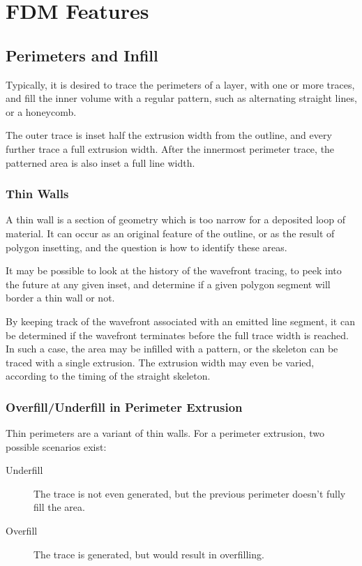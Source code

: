 \documentclass[12pt,a4paper,oneside,openany]{article}
\begin{document}
\section{FDM Features}

\subsection {Perimeters and Infill}

Typically, it is desired to trace the perimeters of a layer, with one or more traces, and fill the inner volume with a regular pattern, such as alternating straight lines, or a honeycomb.

The outer trace is inset half the extrusion width from the outline, and every further trace a full extrusion width. After the innermost perimeter trace, the patterned area is also inset a full line width.

\subsubsection{Thin Walls}

A thin wall is a section of geometry which is too narrow for a deposited loop of material. It can occur as an original feature of the outline, or as the result of polygon insetting, and the question is how to identify these areas.

It may be possible to look at the history of the wavefront tracing, to peek into the future at any given inset, and determine if a given polygon segment will border a thin wall or not.

By keeping track of the wavefront associated with an emitted line segment, it can be determined if the wavefront terminates before the full trace width is reached. In such a case, the area may be infilled with a pattern, or the skeleton can be traced with a single extrusion. The extrusion width may even be varied, according to the timing of the straight skeleton.

\subsubsection{Overfill/Underfill in Perimeter Extrusion}

Thin perimeters are a variant of thin walls. For a perimeter extrusion, two possible scenarios exist:
\begin{description}
\item[Underfill] The trace is not even generated, but the previous perimeter doesn't fully fill the area.
\item[Overfill] The trace is generated, but would result in overfilling.
\end{description}
\end{document}
